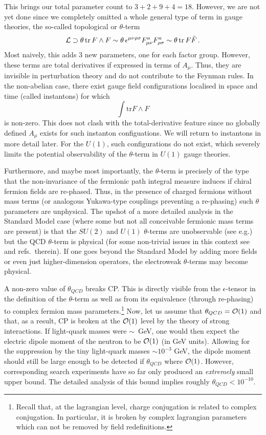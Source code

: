 \documentclass[12pt]{article}
\newcommand{\be}{\begin{equation}}
\newcommand{\ee}{\end{equation}}
\numberwithin{equation}{section}
\begin{document}
This brings our total parameter count to $3+2+9+4=18$. However, we are not yet done since we completely omitted a whole general type of term in gauge theories, the so-called topological or $\theta$-term 
\be
{\cal L}\supset \theta\,\mbox{tr}\,F\wedge F\sim \theta\, \epsilon^{\mu\nu\rho\sigma}F_{\mu\nu}^a F_{\rho\sigma}^a \sim \theta\,\mbox{tr}\,F\tilde{F}\,.
\ee
Most naively, this adds 3 new parameters, one for each factor group. However, these terms are total derivatives if expressed in terms of $A_\mu$. Thus, they are invisible in perturbation theory and do not contribute to the Feynman rules. In the non-abelian case, there exist gauge field configurations localised in space and time (called instantons) for which 
\be
\int \mbox{tr}  F\wedge F
\ee
is non-zero. This does not clash with the total-derivative feature since no globally defined $A_\mu$ exists for such instanton configuations. We will return to instantons in more detail later. For the $U(1)$, such configurations do not exist, which severely limits the potential observability of the $\theta$-term in $U(1)$ gauge theories. 

Furthermore, and maybe most importantly, the $\theta$-term is precisely of the type that the non-invariance of the fermionic path integral measure induces if chiral fermion fields are re-phased. Thus, in the presence of charged fermions without mass terms (or analogous Yukawa-type couplings preventing a re-phasing) such $\theta$ parameters are unphysical. The upshot of a more detailed analysis in the Standard Model case (where some but not all conceivable fermionic mass terms are present) is that the $SU(2)$ and $U(1)$ $\theta$-terms are unobservable (see e.g.\cite{Anselm:1993uj}) but the QCD $\theta$-term is physical (for some non-trivial issues in this context see \cite{Cao:2017ocv} and refs.~therein). If one goes beyond the Standard Model by adding more fields or even just higher-dimension operators, the electroweak $\theta$-terms may become physical. 

A non-zero value of $\theta_{QCD}$ breaks CP. This is directly visible from the $\epsilon$-tensor in the definition of the $\theta$-term as well as from its equivalence (through re-phasing) to complex fermion mass parameters.\footnote{
Recall that, at the lagrangian level, charge conjugation is related to complex conjugation. In particular, it is broken by complex lagrangian parameters which can not be removed by field redefinitions.
}
Now, let us assume that $\theta_{QCD}={\cal O}(1)$ and that, as a result, CP is broken at the ${\cal O}(1)$ level by the theory of strong interactions. If light-quark masses were $\sim$~GeV, one would then expect the electric dipole moment of the neutron to be ${\cal O}(1)$ (in GeV units). Allowing for the suppression by the tiny light-quark masses $\sim 10^{-3}$ GeV, the dipole moment should still be large enough to be detected if $\theta_{QCD}$ where ${\cal O}(1)$. However, corresponding search experiments have so far only produced an {\it extremely} small upper bound. The detailed analysis of this bound implies roughly $\theta_{QCD}<10^{-10}$. 
\end{document}
